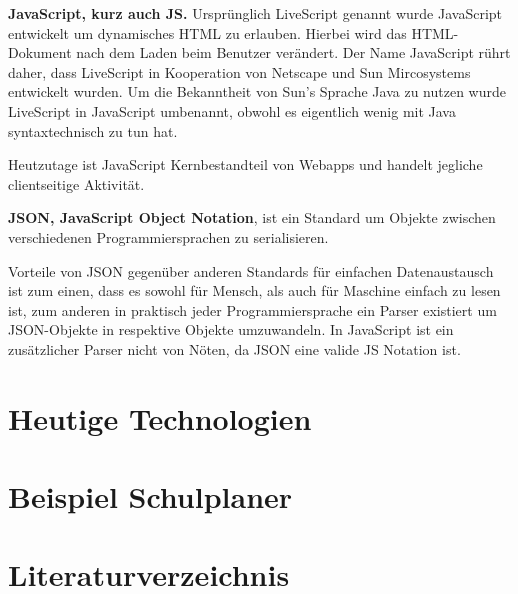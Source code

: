 \documentclass[a4paper,12pt]{scrartcl}      %
\let\oldcite\cite
\renewcommand{\cite}[1]{\textsuperscript{\oldcite{#1}}}
\newcommand{\spacer}{\par\bigskip\noindent}
\begin{document}
	
	
	\spacer\textbf{JavaScript, kurz auch JS.} Ursprünglich LiveScript genannt wurde JavaScript entwickelt um dynamisches HTML zu erlauben. Hierbei wird das HTML-Dokument nach dem Laden beim Benutzer verändert. Der Name JavaScript rührt daher, dass LiveScript in Kooperation von Netscape und Sun Mircosystems entwickelt wurden. Um die Bekanntheit von Sun's Sprache Java zu nutzen wurde LiveScript in JavaScript umbenannt, obwohl es eigentlich wenig mit Java syntaxtechnisch zu tun hat. \cite{jsWiki}\par
	Heutzutage ist JavaScript Kernbestandteil von Webapps und handelt jegliche clientseitige Aktivität.\par
	
	
	\spacer\textbf{JSON, JavaScript Object Notation}, ist ein Standard um Objekte zwischen verschiedenen Programmiersprachen zu serialisieren.\par
	Vorteile von JSON gegenüber anderen Standards für einfachen Datenaustausch ist zum einen, dass es sowohl für Mensch, als auch für Maschine einfach zu lesen ist, zum anderen in praktisch jeder Programmiersprache ein Parser existiert um JSON-Objekte in respektive Objekte umzuwandeln. In JavaScript ist ein zusätzlicher Parser nicht von Nöten, da JSON eine valide JS Notation ist.\cite{json}\par
	
	
	
	\section{Heutige Technologien}
	\section{Beispiel Schulplaner}
	
	
	
	\newpage

	\section{Literaturverzeichnis}
	\printbibliography[heading=none]
\end{document}
